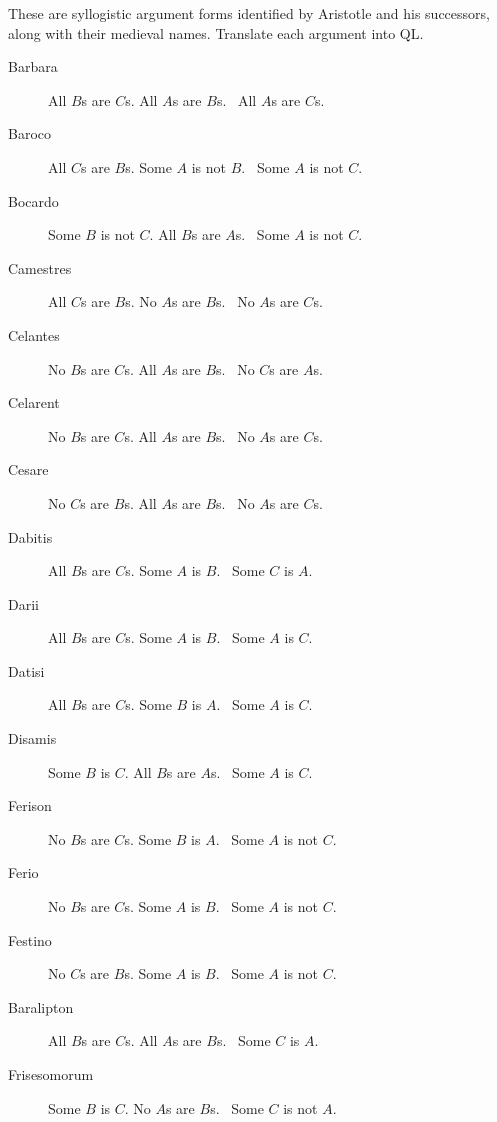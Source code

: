 \problempart
\label{pr.BarbaraEtc}
These are syllogistic argument forms identified by Aristotle and his successors, along with their medieval names. Translate each argument into QL.
\begin{description}
\item[Barbara] All $B$s are $C$s. All $A$s are $B$s.
	\therefore\  All $A$s are $C$s.
\item[Baroco] All $C$s are $B$s. Some $A$ is not $B$.
	\therefore\  Some $A$ is not $C$.
\item[Bocardo] Some $B$ is not $C$. All $B$s are $A$s.
	\therefore\  Some $A$ is not $C$.
\item[Camestres] All $C$s are $B$s. No $A$s are $B$s.
	\therefore\  No $A$s are $C$s.
\item[Celantes] No $B$s are $C$s. All $A$s are $B$s.
	\therefore\  No $C$s are $A$s.
\item[Celarent] No $B$s are $C$s. All $A$s are $B$s.
	\therefore\  No $A$s are $C$s.
\item[Cesare] No $C$s are $B$s. All $A$s are $B$s.
	\therefore\  No $A$s are $C$s.
\item[Dabitis] All $B$s are $C$s. Some $A$ is $B$.
	\therefore\  Some $C$ is $A$.
\item[Darii] All $B$s are $C$s. Some $A$ is $B$.
	\therefore\  Some $A$ is $C$.
\item[Datisi] All $B$s are $C$s. Some $B$ is $A$.
	\therefore\  Some $A$ is $C$.
\item[Disamis] Some $B$ is $C$. All $B$s are $A$s.
	\therefore\  Some $A$ is $C$.
\item[Ferison] No $B$s are $C$s. Some $B$ is $A$.
	\therefore\  Some $A$ is not $C$.
\item[Ferio] No $B$s are $C$s. Some $A$ is $B$.
	\therefore\  Some $A$ is not $C$.
\item[Festino] No $C$s are $B$s. Some $A$ is $B$.
	\therefore\  Some $A$ is not $C$.
\item[Baralipton] All $B$s are $C$s. All $A$s are $B$s.
	\therefore\  Some $C$ is $A$.
\item[Frisesomorum] Some $B$ is $C$. No $A$s are $B$s.
	\therefore\  Some $C$ is not $A$.
\end{description}


